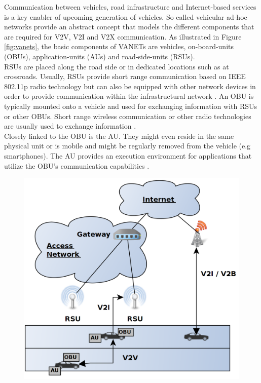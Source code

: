 \documentclass{llncs}
\begin{document}
{			Communication between vehicles, road infrastructure and Internet-based services is a key enabler of upcoming generation of vehicles. So called vehicular ad-hoc networks provide an abstract concept that models the different components that are required for V2V, V2I and V2X communication. As illustrated in Figure \ref{fig:vanets}, the basic components of VANETs are vehicles, on-board-units (OBUs), application-units (AUs) and road-side-units (RSUs).\\
			RSUs are placed  along the road side or in dedicated locations such as at crossroads. Usually, RSUs provide short range communication based on IEEE 802.11p radio technology but can also be equipped with other network devices in order to provide communication within the infrastructural network \cite{al2014comprehensive}. An OBU is typically mounted onto a vehicle and used for exchanging information with RSUs or other OBUs. Short range wireless communication or other radio technologies are usually used to exchange information \cite{baldessari2007car}.\\
			Closely linked to the OBU is the AU. They might even reside in the same physical unit or is mobile and might be regularly removed from the vehicle (e.g smartphones). The AU provides an execution environment for applications that utilize the OBU's communication capabilities \cite{al2014comprehensive}\cite{baldessari2007car}.\\	
			\begin{figure}[ht]
				\centering
				\includegraphics[scale=0.2]{Figures/Vanets.png}

\end{figure}}
\end{document}
